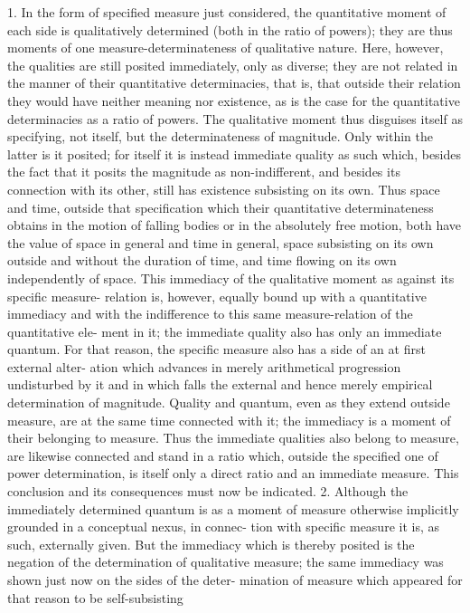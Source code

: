 1. In the form of specified measure just considered, the quantitative moment
of each side is qualitatively determined (both in the ratio of powers); they
are thus moments of one measure-determinateness of qualitative nature.
Here, however, the qualities are still posited immediately, only as diverse;
they are not related in the manner of their quantitative determinacies, that
is, that outside their relation they would have neither meaning nor existence,
as is the case for the quantitative determinacies as a ratio of powers. The
qualitative moment thus disguises itself as specifying, not itself, but the
determinateness of magnitude. Only within the latter is it posited; for
itself it is instead immediate quality as such which, besides the fact that it
posits the magnitude as non-indifferent, and besides its connection with
its other, still has existence subsisting on its own. Thus space and time,
outside that specification which their quantitative determinateness obtains
in the motion of falling bodies or in the absolutely free motion, both have
the value of space in general and time in general, space subsisting on its
own outside and without the duration of time, and time flowing on its
own independently of space.
This immediacy of the qualitative moment as against its specific measure-
relation is, however, equally bound up with a quantitative immediacy and
with the indifference to this same measure-relation of the quantitative ele-
ment in it; the immediate quality also has only an immediate quantum. For
that reason, the specific measure also has a side of an at first external alter-
ation which advances in merely arithmetical progression undisturbed by it
and in which falls the external and hence merely empirical determination
of magnitude. Quality and quantum, even as they extend outside measure,
are at the same time connected with it; the immediacy is a moment of
their belonging to measure. Thus the immediate qualities also belong to
measure, are likewise connected and stand in a ratio which, outside the
specified one of power determination, is itself only a direct ratio and an
immediate measure. This conclusion and its consequences must now be
indicated.
2. Although the immediately determined quantum is as a moment of
measure otherwise implicitly grounded in a conceptual nexus, in connec-
tion with specific measure it is, as such, externally given. But the immediacy
which is thereby posited is the negation of the determination of qualitative
measure; the same immediacy was shown just now on the sides of the deter-
mination of measure which appeared for that reason to be self-subsisting
